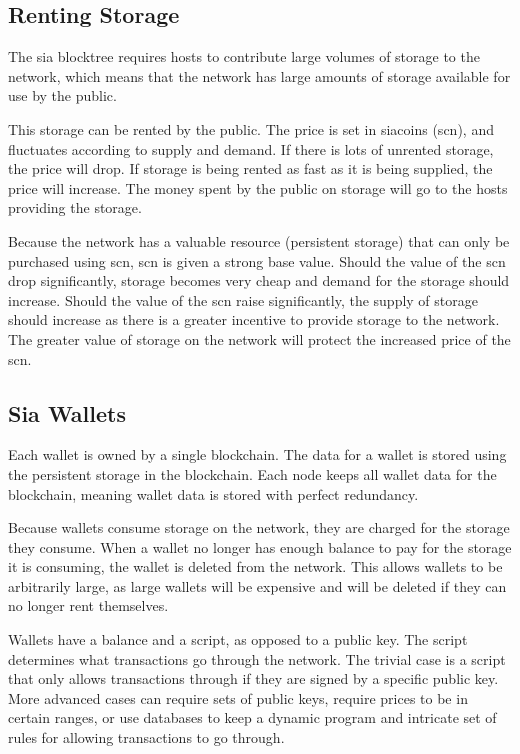 \documentclass[a4paper,10pt]{article}
\begin{document}
\subsection{Renting Storage}
\par
	The sia blocktree requires hosts to contribute large volumes of storage 
to the network, which means that the network has large amounts of storage 
available for use by the public.
\par
This storage can be rented by the public. The price is set in siacoins (scn), 
and fluctuates according to supply and demand. If there is lots of unrented 
storage, the price will drop. If storage is being rented as fast as it is being 
supplied, the price will increase. The money spent by the public on storage 
will go to the hosts providing the storage.
\par
	Because the network has a valuable resource (persistent storage) that 
can only be purchased using scn, scn is given a strong base value. Should the 
value of the scn drop significantly, storage becomes very cheap and demand for 
the storage should increase. Should the value of the scn raise significantly, 
the supply of storage should increase as there is a greater incentive to 
provide storage to the network. The greater value of storage on the network 
will protect the increased price of the scn.
\subsection{Sia Wallets}
	Each wallet is owned by a single blockchain. The data for a wallet is 
stored using the persistent storage in the blockchain. Each node keeps all 
wallet data for the blockchain, meaning wallet data is stored with perfect 
redundancy.
\par
	Because wallets consume storage on the network, they are charged for 
the storage they consume. When a wallet no longer has enough balance to pay for 
the storage it is consuming, the wallet is deleted from the network. This 
allows wallets to be arbitrarily large, as large wallets will be expensive and 
will be deleted if they can no longer rent themselves.
\par
	Wallets have a balance and a script, as opposed to a public key. The 
script determines what transactions go through the network. The trivial case is 
a script that only allows transactions through if they are signed by a specific 
public key. More advanced cases can require sets of public keys, require prices 
to be in certain ranges, or use databases to keep a dynamic program and 
intricate set of rules for allowing transactions to go through.

\end{document}
